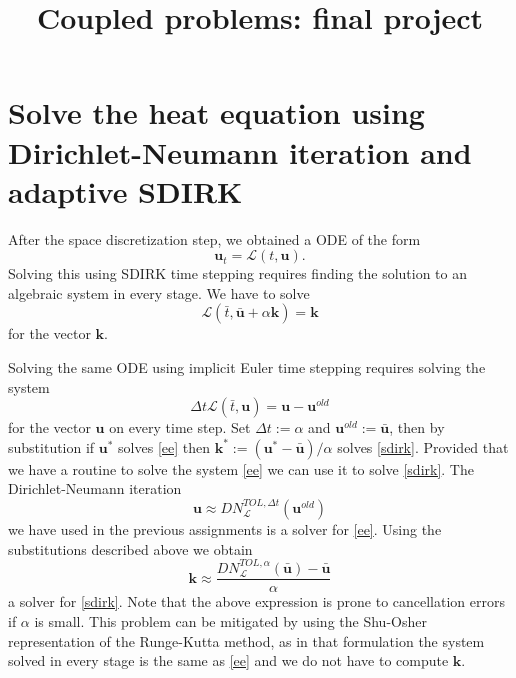\documentclass[]{article}
\title{Coupled problems: final project}
\begin{document}
\maketitle

\section{Solve the heat equation using Dirichlet-Neumann iteration and adaptive SDIRK}

After the space discretization step, we obtained a ODE of the form
\begin{equation}
    \mathbf{u}_t = \mathcal{L}(t, \mathbf{u}).
\end{equation}
Solving this using SDIRK time stepping requires finding the solution to an algebraic system in every stage. We have to solve
\begin{equation}
\label{sdirk}
\mathbf{\mathcal{L}}(\bar t, \mathbf{\bar{u}} + \alpha \mathbf{k}) = \mathbf{k}
\end{equation}
for the vector $\mathbf{k}$.

Solving the same ODE using implicit Euler time stepping requires solving the system
\begin{equation}
\label{ee}
\Delta t \mathbf{\mathcal{L}}(\bar{t}, \mathbf{u}) = \mathbf{u} - \mathbf{u}^{old}
\end{equation}
for the vector $\mathbf{u}$ on every time step. Set $\Delta t := \alpha$ and $\mathbf{u}^{old} := \mathbf{\bar{u}}$, then by substitution if $\mathbf{u}^*$ solves \eqref{ee} then $\mathbf{k}^* := (\mathbf{u}^* - \mathbf{\bar{u}})/\alpha$ solves \eqref{sdirk}. Provided that we have a routine to solve the system \eqref{ee} we can use it to solve \eqref{sdirk}. The Dirichlet-Neumann iteration 
\begin{equation}
\mathbf{u} \approx DN_{\mathcal{L}}^{TOL,\Delta t}(\mathbf{u}^{old})
\end{equation}
we have used in the previous assignments is a solver for \eqref{ee}. Using the substitutions described above we obtain
\begin{equation}
\mathbf{k} \approx \frac{DN_{\mathcal{L}}^{TOL,\alpha}(\mathbf{\bar{u}}) -  \mathbf{\bar{u}}}{\alpha}
\end{equation}
a solver for \eqref{sdirk}. Note that the above expression is prone to cancellation errors if $\alpha$ is small. This problem can be mitigated by using the Shu-Osher representation\cite{shuosher} of the Runge-Kutta method, as in that formulation the system solved in every stage is the same as \eqref{ee} and we do not have to compute $\mathbf{k}$.
\end{document}

